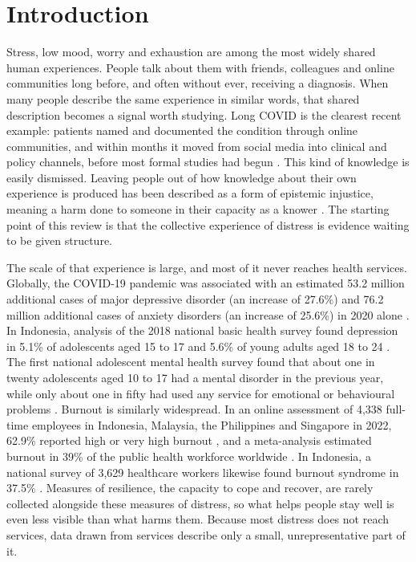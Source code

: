 \documentclass[
  number,
  preprint]{elsarticle}
\begin{document}
\section{Introduction}\label{sec-introduction}

Stress, low mood, worry and exhaustion are among the most widely shared
human experiences. People talk about them with friends, colleagues and
online communities long before, and often without ever, receiving a
diagnosis. When many people describe the same experience in similar
words, that shared description becomes a signal worth studying. Long
COVID is the clearest recent example: patients named and documented the
condition through online communities, and within months it moved from
social media into clinical and policy channels, before most formal
studies had begun \citep{callard2021}. This kind of knowledge is easily
dismissed. Leaving people out of how knowledge about their own
experience is produced has been described as a form of epistemic
injustice, meaning a harm done to someone in their capacity as a knower
\citep{okoroji2023}. The starting point of this review is that the
collective experience of distress is evidence waiting to be given
structure.

The scale of that experience is large, and most of it never reaches
health services. Globally, the COVID-19 pandemic was associated with an
estimated 53.2 million additional cases of major depressive disorder (an
increase of 27.6\%) and 76.2 million additional cases of anxiety
disorders (an increase of 25.6\%) in 2020 alone \citep{covidmental2021}.
In Indonesia, analysis of the 2018 national basic health survey found
depression in 5.1\% of adolescents aged 15 to 17 and 5.6\% of young
adults aged 18 to 24 \citep{suryaputri2022}. The first national
adolescent mental health survey found that about one in twenty
adolescents aged 10 to 17 had a mental disorder in the previous year,
while only about one in fifty had used any service for emotional or
behavioural problems \citep{inamhs2022}. Burnout is similarly
widespread. In an online assessment of 4,338 full-time employees in
Indonesia, Malaysia, the Philippines and Singapore in 2022, 62.9\%
reported high or very high burnout \citep{abdulaziz2024}, and a
meta-analysis estimated burnout in 39\% of the public health workforce
worldwide \citep{nagarajan2024}. In Indonesia, a national survey of
3,629 healthcare workers likewise found burnout syndrome in 37.5\%
\citep{lamuri2023}. Measures of resilience, the capacity to cope and
recover, are rarely collected alongside these measures of distress, so
what helps people stay well is even less visible than what harms them.
Because most distress does not reach services, data drawn from services
describe only a small, unrepresentative part of it.
\end{document}

